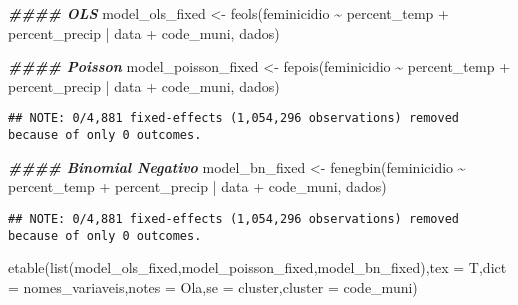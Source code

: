 \documentclass[
]{article}
\newenvironment{Shaded}{\begin{snugshade}}{\end{snugshade}}
\newcommand{\AttributeTok}[1]{\textcolor[rgb]{0.77,0.63,0.00}{#1}}
\newcommand{\DocumentationTok}[1]{\textcolor[rgb]{0.56,0.35,0.01}{\textbf{\textit{#1}}}}
\newcommand{\FunctionTok}[1]{\textcolor[rgb]{0.00,0.00,0.00}{#1}}
\newcommand{\NormalTok}[1]{#1}
\newcommand{\OtherTok}[1]{\textcolor[rgb]{0.56,0.35,0.01}{#1}}
\newcommand{\SpecialCharTok}[1]{\textcolor[rgb]{0.00,0.00,0.00}{#1}}
\newcommand{\StringTok}[1]{\textcolor[rgb]{0.31,0.60,0.02}{#1}}
\begin{document}
\begin{Shaded}
\begin{Highlighting}[]
\DocumentationTok{\#\#\#\# OLS}
\NormalTok{model\_ols\_fixed }\OtherTok{\textless{}{-}} \FunctionTok{feols}\NormalTok{(feminicidio  }\SpecialCharTok{\textasciitilde{}}\NormalTok{ percent\_temp }\SpecialCharTok{+}\NormalTok{ percent\_precip }\SpecialCharTok{|}\NormalTok{ data }\SpecialCharTok{+}\NormalTok{ code\_muni, dados)}

\DocumentationTok{\#\#\#\# Poisson}
\NormalTok{model\_poisson\_fixed }\OtherTok{\textless{}{-}} \FunctionTok{fepois}\NormalTok{(feminicidio  }\SpecialCharTok{\textasciitilde{}}\NormalTok{ percent\_temp }\SpecialCharTok{+}\NormalTok{ percent\_precip }\SpecialCharTok{|}\NormalTok{ data }\SpecialCharTok{+}\NormalTok{ code\_muni, dados)}
\end{Highlighting}
\end{Shaded}

\begin{verbatim}
## NOTE: 0/4,881 fixed-effects (1,054,296 observations) removed because of only 0 outcomes.
\end{verbatim}

\begin{Shaded}
\begin{Highlighting}[]
\DocumentationTok{\#\#\#\# Binomial Negativo}
\NormalTok{model\_bn\_fixed }\OtherTok{\textless{}{-}} \FunctionTok{fenegbin}\NormalTok{(feminicidio  }\SpecialCharTok{\textasciitilde{}}\NormalTok{ percent\_temp }\SpecialCharTok{+}\NormalTok{ percent\_precip }\SpecialCharTok{|}\NormalTok{ data }\SpecialCharTok{+}\NormalTok{ code\_muni, dados)}
\end{Highlighting}
\end{Shaded}

\begin{verbatim}
## NOTE: 0/4,881 fixed-effects (1,054,296 observations) removed because of only 0 outcomes.
\end{verbatim}

\begin{Shaded}
\begin{Highlighting}[]
\FunctionTok{etable}\NormalTok{(}\FunctionTok{list}\NormalTok{(model\_ols\_fixed,model\_poisson\_fixed,model\_bn\_fixed),}\AttributeTok{tex =}\NormalTok{ T,}\AttributeTok{dict =}\NormalTok{ nomes\_variaveis,}\AttributeTok{notes =} \StringTok{\textquotesingle{}Ola\textquotesingle{}}\NormalTok{,}\AttributeTok{se =} \StringTok{\textquotesingle{}cluster\textquotesingle{}}\NormalTok{,}\AttributeTok{cluster =} \StringTok{\textquotesingle{}code\_muni\textquotesingle{}}\NormalTok{)}
\end{Highlighting}
\end{Shaded}
\end{document}
